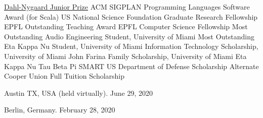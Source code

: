 \documentclass[9pt]{article}
\begin{document}
\noindent \href{https://sites.google.com/aito.org/home/aito-dahl-nygaard/2023-winners}{Dahl-Nygaard Junior Prize} 
\newline\noindent ACM SIGPLAN Programming Languages Software Award (for Scala) 
\newline\noindent US National Science Foundation Graduate Research Fellowship 
\newline\noindent EPFL Outstanding Teaching Award 
\newline\noindent EPFL Computer Science Fellowship 
\newline\noindent Most Outstanding Audio Engineering Student, University of Miami 
\newline\noindent Most Outstanding Eta Kappa Nu Student, University of Miami 
\newline\noindent Information Technology Scholarship, University of Miami 
\newline\noindent John Farina Family Scholarship, University of Miami 
\newline\noindent Eta Kappa Nu 
\newline\noindent Tau Beta Pi 
\newline\noindent SMART US Department of Defense Scholarship Alternate 
\newline\noindent Cooper Union Full Tuition Scholarship 

\bigskip


\medskip
{}

\vspace{-0.03in}
\linebreak\noindent Austin TX, USA (held virtually). June 29, 2020 
\bigskip


\vspace{-0.03in}
\linebreak\noindent Berlin, Germany. February 28, 2020 
\bigskip
\end{document}
